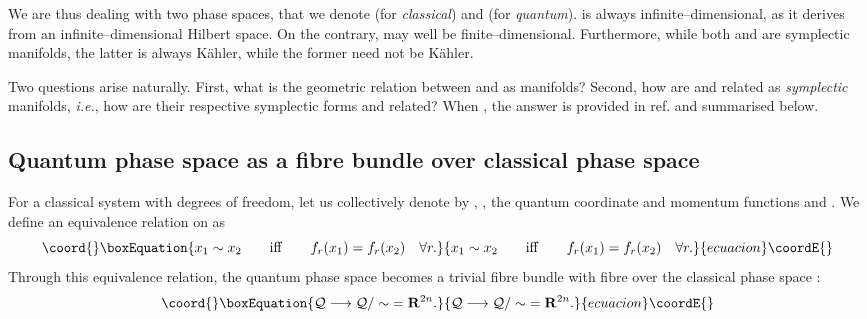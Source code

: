 \documentclass[a4paper,a4paper]{article}
\begin{document}
We are thus dealing with two phase spaces, that we denote \coordHE{} (for {\it classical}\/) 
and \coordHE{} (for {\it quantum}). \coordHE{} is always infinite--dimensional, 
as it derives from an infinite--dimensional Hilbert space. 
On the contrary, \coordHE{} may well be finite--dimensional. 
Furthermore, while both \coordHE{} and \coordHE{} are symplectic manifolds, 
the latter is always K\"ahler, while the former need not be K\"ahler.

Two questions arise naturally. First, what is the geometric relation between \coordHE{} 
and \coordHE{} as manifolds? Second, how are \coordHE{} and \coordHE{} related as 
{\it symplectic} manifolds, {\it i.e.}, how are their respective symplectic forms 
\coordHE{} and \coordHE{} related? When \coordHE{}, 
the answer is provided in ref. \cite{ASHTEKAR} and summarised below.

\subsection{Quantum phase space as a fibre bundle over classical phase space}\label{fibover}

For a classical system with \coordHE{} degrees of freedom, let us collectively 
denote by \coordHE{}, \coordHE{}, the quantum coordinate 
and momentum functions \coordHE{} and \coordHE{}. 
We define an equivalence relation on \coordHE{} as
\begin{equation}\coord{}\boxEquation{
x_1\sim x_2\qquad {\rm iff} \qquad f_r(x_1)=f_r(x_2)\quad \forall r.
\label{equival}
}{
x_1\sim x_2\qquad {\rm iff} \qquad f_r(x_1)=f_r(x_2)\quad \forall r.
}{ecuacion}\coordE{}\end{equation}
Through this equivalence relation, the quantum phase space \coordHE{} becomes 
a trivial fibre bundle with fibre \coordHE{} over the classical phase space 
\coordHE{}:
\begin{equation}\coord{}\boxEquation{
{\cal Q}\longrightarrow {\cal Q}/\sim\;={\bf R}^{2n}.
\label{mod}
}{
{\cal Q}\longrightarrow {\cal Q}/\sim\;={\bf R}^{2n}.
}{ecuacion}\coordE{}\end{equation} 
\end{document}
